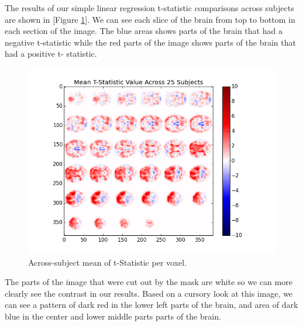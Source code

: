 \par \indent The results of our simple linear regression t-statistic
comparisons across subjects are shown in [Figure \ref{fig:ht}]. We can see
each slice of the brain from top to bottom in each section of the image. The
blue areas shows parts of the brain that had a negative t-statistic while the
red parts of the image shows parts of the brain that had a positive t-
statistic.

\begin{figure}[ht] \centering
\includegraphics[scale=0.5]{images/hypothesis_testing} \caption{Across-subject
mean of t-Statistic per voxel.} \label{fig:ht} \end{figure}

\par The parts of the image that were cut out by the mask are white so we can
more clearly see the contrast in our results. Based on a cursory look at this
image, we can see a pattern of dark red in the lower left parts of the brain,
and area of dark blue in the center and lower middle parts parts of the brain.

